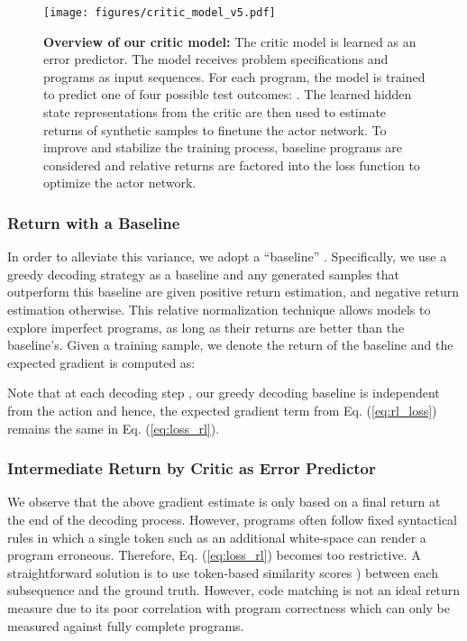 \documentclass{article}
\begin{document}
\begin{figure}[t]
	\centering
	\resizebox{1.0\textwidth}{!} {
	\texttt{[image: figures/critic\_model\_v5.pdf]}
	}
	\caption{
	\textbf{Overview of our critic model:}
	The critic model is learned as an error predictor.
	The model receives problem specifications and programs as input sequences. 
	For each program, the model is trained to predict one of four possible test outcomes: 
	.
	The learned hidden state representations from the critic are then used to estimate returns of synthetic samples to finetune the actor network. 
	To improve and stabilize the training process, baseline programs are considered and relative returns are factored into the loss function to optimize the actor network. 
	}
	\label{fig:critic_model}
\end{figure}

\subsubsection{Return with a Baseline}
In order to alleviate this variance, we adopt a ``baseline'' \citep{sutton2018reinforcement}. 
Specifically, we use a greedy decoding strategy as a baseline and any generated samples that outperform this baseline are given positive return estimation, and negative return estimation otherwise. 
This relative normalization technique allows models to explore imperfect programs, as long as their returns are better than the baseline's.
Given a training sample, we denote the return of the baseline  and 
the expected gradient is computed as: 

Note that at each decoding step , our greedy decoding baseline is independent from the action  and hence, the expected gradient term  from Eq. (\ref{eq:rl_loss}) remains the same in Eq. (\ref{eq:loss_rl}).



\subsubsection{Intermediate Return by Critic as Error Predictor}
We observe that the above gradient estimate is only based on a final return at the end of the decoding process. 
However, programs often follow fixed syntactical rules in which a single token such as an additional white-space can render a program erroneous. 
Therefore, Eq. (\ref{eq:loss_rl}) becomes too restrictive. 
A straightforward solution is to use token-based similarity scores \citep{papineni2002bleu, ren2020codebleu}) between each subsequence  and the ground truth. 
However, code matching is not an ideal return measure due to its poor correlation with program correctness \citep{hendrycksapps2021, chen2021evaluating, austin2021program} which can only be measured against fully complete programs. 
\end{document}
